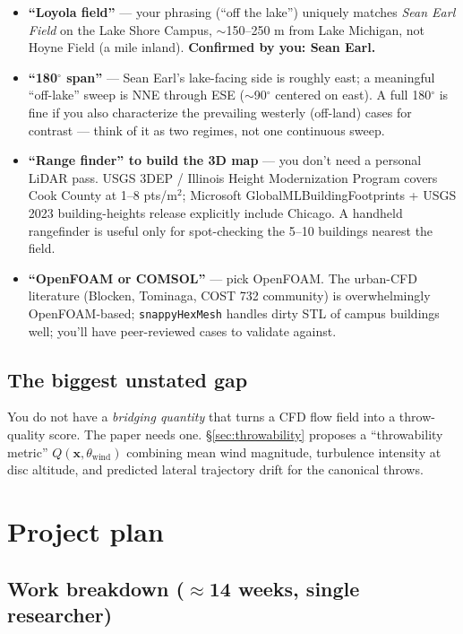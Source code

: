 \documentclass[11pt,letterpaper]{article}
\begin{document}
\begin{itemize}[leftmargin=*,itemsep=2pt]
  \item \textbf{``Loyola field''} --- your phrasing (``off the lake'') uniquely matches \emph{Sean Earl Field} on the Lake Shore Campus, $\sim$150--250 m from Lake Michigan, not Hoyne Field (a mile inland). \textbf{Confirmed by you: Sean Earl.}
  \item \textbf{``180$^\circ$ span''} --- Sean Earl's lake-facing side is roughly east; a meaningful ``off-lake'' sweep is NNE through ESE ($\sim$90$^\circ$ centered on east). A full 180$^\circ$ is fine if you also characterize the prevailing westerly (off-land) cases for contrast --- think of it as two regimes, not one continuous sweep.
  \item \textbf{``Range finder'' to build the 3D map} --- you don't need a personal LiDAR pass. USGS 3DEP / Illinois Height Modernization Program covers Cook County at 1--8 pts/m$^2$; Microsoft GlobalMLBuildingFootprints + USGS 2023 building-heights release explicitly include Chicago. A handheld rangefinder is useful only for spot-checking the 5--10 buildings nearest the field.
  \item \textbf{``OpenFOAM or COMSOL''} --- pick OpenFOAM. The urban-CFD literature (Blocken, Tominaga, COST 732 community) is overwhelmingly OpenFOAM-based; \texttt{snappyHexMesh} handles dirty STL of campus buildings well; you'll have peer-reviewed cases to validate against.
\end{itemize}

\subsection{The biggest unstated gap}

You do not have a \emph{bridging quantity} that turns a CFD flow field into a throw-quality score. The paper needs one. \S\ref{sec:throwability} proposes a ``throwability metric'' $Q(\mathbf{x}, \theta_{\text{wind}})$ combining mean wind magnitude, turbulence intensity at disc altitude, and predicted lateral trajectory drift for the canonical throws.

\section{Project plan}
\label{sec:plan}

\subsection{Work breakdown ($\approx$14 weeks, single researcher)}
\end{document}
